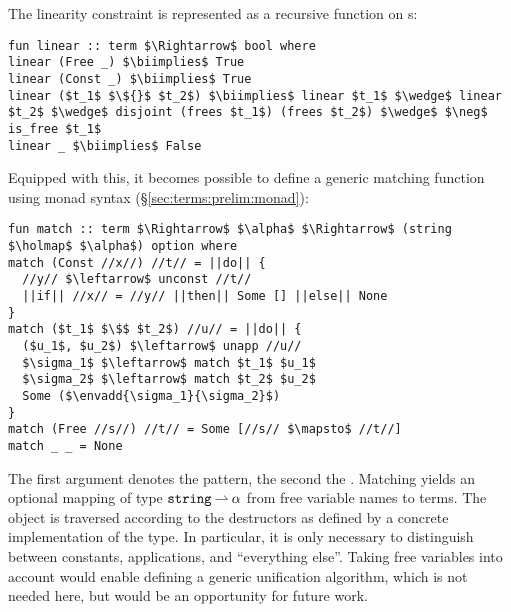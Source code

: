 The linearity constraint is represented as a recursive function on s:
%
\begin{lstlisting}[language=Isabelle]
fun linear :: term $\Rightarrow$ bool where
linear (Free _) $\biimplies$ True
linear (Const _) $\biimplies$ True
linear ($t_1$ $\${}$ $t_2$) $\biimplies$ linear $t_1$ $\wedge$ linear $t_2$ $\wedge$ disjoint (frees $t_1$) (frees $t_2$) $\wedge$ $\neg$ is_free $t_1$
linear _ $\biimplies$ False
\end{lstlisting}
%
Equipped with this, it becomes possible to define a generic matching function using monad syntax (§\ref{sec:terms:prelim:monad}):
%
\begin{lstlisting}[language=Isabelle]
fun match :: term $\Rightarrow$ $\alpha$ $\Rightarrow$ (string $\holmap$ $\alpha$) option where
match (Const //x//) //t// = ||do|| {
  //y// $\leftarrow$ unconst //t//
  ||if|| //x// = //y// ||then|| Some [] ||else|| None
}
match ($t_1$ $\$$ $t_2$) //u// = ||do|| {
  ($u_1$, $u_2$) $\leftarrow$ unapp //u//
  $\sigma_1$ $\leftarrow$ match $t_1$ $u_1$
  $\sigma_2$ $\leftarrow$ match $t_2$ $u_2$
  Some ($\envadd{\sigma_1}{\sigma_2}$)
}
match (Free //s//) //t// = Some [//s// $\mapsto$ //t//]
match _ _ = None
\end{lstlisting}
%
The first argument denotes the pattern, the second the .
Matching yields an optional mapping of type $\texttt{\textup{string}} \mathbin{\rightharpoonup} \alpha$ from free variable names to terms.
The object is traversed according to the destructors as defined by a concrete implementation of the  type.
In particular, it is only necessary to distinguish between constants, applications, and ``everything else''.
Taking free variables into account would enable defining a generic unification algorithm, which is not needed here, but would be an opportunity for future work.


